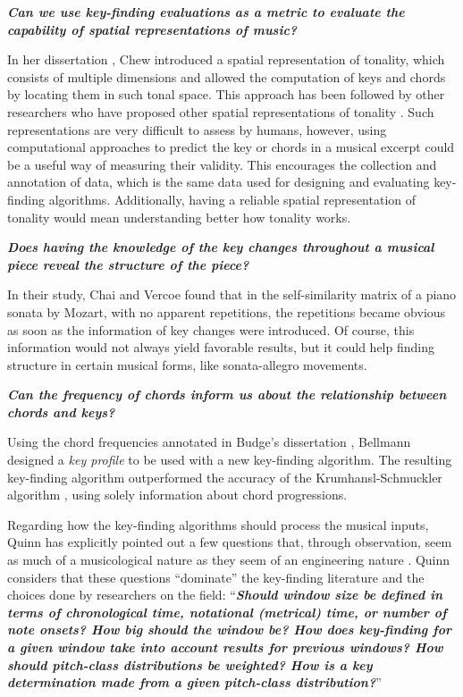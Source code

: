 \textbf{\emph{Can we use key-finding evaluations as a metric to evaluate the capability of spatial representations of music?}}

In her dissertation \cite{chew2000towards}, Chew introduced a spatial representation of tonality, which consists of multiple dimensions and allowed the computation of keys and chords by locating them in such tonal space. This approach has been followed by other researchers who have proposed other spatial representations of tonality \cite{harte2006detecting}. Such representations are very difficult to assess by humans, however, using computational approaches to predict the key or chords in a musical excerpt could be a useful way of measuring their validity. This encourages the collection and annotation of data, which is the same data used for designing and evaluating key-finding algorithms. Additionally, having a reliable spatial representation of tonality would mean understanding better how tonality works. 

\textbf{\emph{Does having the knowledge of the key changes throughout a musical piece reveal the structure of the piece?}} 

In their study, Chai and Vercoe \cite{chai2005detection} found that in the self-similarity matrix of a piano sonata by Mozart, with no apparent repetitions, the repetitions became obvious as soon as the information of key changes were introduced. Of course, this information would not always yield favorable results, but it could help finding structure in certain musical forms, like sonata-allegro movements.

\textbf{\emph{Can the frequency of chords inform us about the relationship between chords and keys?}}

Using the chord frequencies annotated in Budge's dissertation \cite{budge1943study}, Bellmann \cite{bellmann2006about} designed a \emph{key profile} to be used with a new key-finding algorithm. The resulting key-finding algorithm outperformed the accuracy of the Krumhansl-Schmuckler algorithm \cite{krumhansl1990cognitive}, using solely information about chord progressions.

Regarding how the key-finding algorithms should process the musical inputs, Quinn has explicitly pointed out a few questions that, through observation, seem as much of a musicological nature as they seem of an engineering nature \cite{quinn2010are}. Quinn considers that these questions ``dominate'' the key-finding literature and the choices done by researchers on the field: ``\textbf{\emph{Should window size be defined in terms of chronological time, notational (metrical) time, or number of note onsets? How big should the window be? How does key-finding for a given window take into account results for previous windows? How should pitch-class distributions be weighted? How is a key determination made from a given pitch-class distribution?}}''

